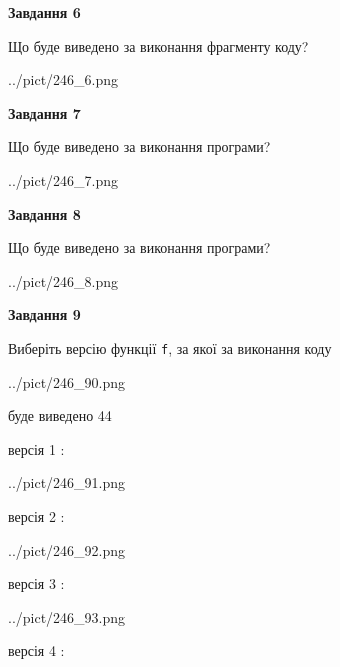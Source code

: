 \documentclass[12pt, ukrainian]{article}
\def\code#1{\Verb!#1!}
\begin{document}
{\begin {large}
{\begin {center}\textbf{Завдання 6}\end {center}}

Що буде виведено за виконання фрагменту коду?\par
\begin{center}
	{../pict/246_6.png}
\end{center}
\newpage

{\begin {center}\textbf{Завдання 7}\end {center}}

Що буде виведено за виконання програми?\par
\begin{center}
	{../pict/246_7.png}
\end{center}
\newpage

{\begin {center}\textbf{Завдання 8}\end {center}}

Що буде виведено за виконання програми?\par
\begin{center}
	{../pict/246_8.png}
\end{center}
\newpage

{\begin {center}\textbf{Завдання 9}\end {center}}

Виберіть версію функції \code{f}, за якої за виконання коду
\begin{center}
	{../pict/246_90.png}
\end{center}
буде виведено 44

\vspace{5mm}
версія 1 :

\begin{center}
	{../pict/246_91.png}
\end{center}
версія 2 :

\begin{center}
	{../pict/246_92.png}
\end{center}
версія 3 :

\begin{center}
	{../pict/246_93.png}
\end{center}
версія 4 :


\end{large}}
\end{document}
